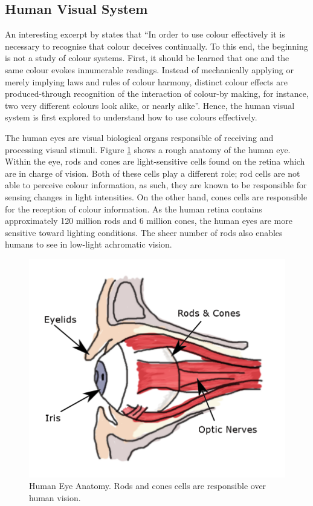 \vspace{1em}
\subsection{Human Visual System}
An interesting excerpt by  states that ``In order to use colour effectively it is necessary to recognise that colour deceives continually. To this end, the beginning is not a study of colour systems.
First, it should be learned that one and the same colour evokes innumerable readings. Instead of mechanically applying or merely implying laws and rules of colour harmony, distinct colour effects are produced-through recognition of the interaction of colour-by making, for instance, two very different colours look alike, or nearly alike''. Hence, the human visual system is first explored to understand how to use colours effectively.

\label{section:eyes}
The human eyes are visual biological organs responsible of receiving and
processing visual stimuli. Figure \ref{fig:eyes} shows a rough anatomy of
the human eye. Within the eye, rods and cones are light-sensitive cells
found on the retina which are in charge of vision. Both of these cells play
a different role; rod cells are not able to perceive colour information, as such, they are known to be responsible for sensing changes in light intensities.
On the other hand, cones cells are responsible for the reception of colour
information. As the human retina contains approximately 120 million rods and
6 million cones, the human eyes are more sensitive toward lighting conditions.
The sheer number of rods also enables humans to see in low-light achromatic
vision.


\begin{figure}[hbt!]\centering
 \includegraphics[width=.5\textwidth]{image/lit/rodsandconscolored.png}
 \caption[Human Eye Anatomy]{Human Eye Anatomy. Rods and cones cells are
 responsible over human vision. %
 }
 \label{fig:eyes}
\end{figure}

